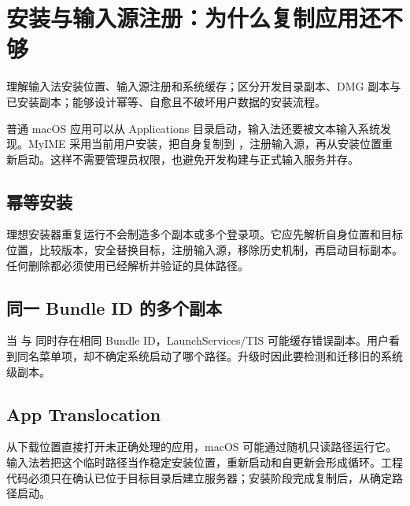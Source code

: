 \chapter{安装与输入源注册：为什么复制应用还不够}

\begin{goals}
理解输入法安装位置、输入源注册和系统缓存；区分开发目录副本、DMG 副本与已安装副本；能够设计幂等、自愈且不破坏用户数据的安装流程。
\end{goals}

普通 macOS 应用可以从 Applications 目录启动，输入法还要被文本输入系统发现。MyIME 采用当前用户安装，把自身复制到 ，注册输入源，再从安装位置重新启动。这样不需要管理员权限，也避免开发构建与正式输入服务并存。


\section{幂等安装}

理想安装器重复运行不会制造多个副本或多个登录项。它应先解析自身位置和目标位置，比较版本，安全替换目标，注册输入源，移除历史机制，再启动目标副本。任何删除都必须使用已经解析并验证的具体路径。



\section{同一 Bundle ID 的多个副本}

当  与  同时存在相同 Bundle ID，LaunchServices/TIS 可能缓存错误副本。用户看到同名菜单项，却不确定系统启动了哪个路径。升级时因此要检测和迁移旧的系统级副本。

\section{App Translocation}

从下载位置直接打开未正确处理的应用，macOS 可能通过随机只读路径运行它。输入法若把这个临时路径当作稳定安装位置，重新启动和自更新会形成循环。工程代码必须只在确认已位于目标目录后建立服务器；安装阶段完成复制后，从确定路径启动。



